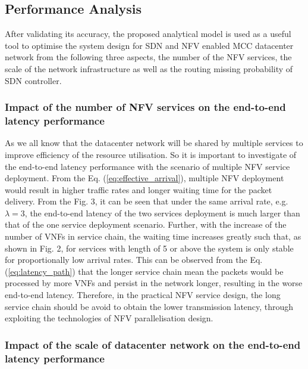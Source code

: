 \subsection{Performance Analysis}
After validating its accuracy, the proposed analytical model is used as a useful tool to optimise the system design for SDN and NFV enabled MCC datacenter network from the following three aspects, the number of the NFV services, the scale of the network infrastructure as well as the routing missing probability of SDN controller.

\subsubsection{Impact of the number of NFV services on the end-to-end latency performance}

As we all know that the datacenter network will be shared by multiple services to improve efficiency of the resource utilisation. So it is important to investigate of the end-to-end latency performance with the scenario of multiple NFV service deployment. From the Eq. (\ref{eq:effective_arrival}), multiple NFV deployment would result in higher traffic rates and longer waiting time for the packet delivery. From the Fig. 3, it can be seen that under the same arrival rate, e.g. $\lambda=3$, the end-to-end latency of the two services deployment is much larger than that of the one service deployment scenario. Further, with the increase of the number of VNFs in service chain, the waiting time increases greatly such that, as shown in Fig. 2, for services with length of 5 or above the system is only stable for proportionally low arrival rates. This can be observed from the Eq. (\ref{eq:latency_path}) that the longer service chain mean the packets would be processed by more VNFs and persist in the network longer, resulting in the worse end-to-end latency. Therefore, in the practical NFV service design, the long service chain should be avoid to obtain the lower transmission latency, through exploiting the technologies of NFV parallelisation design.

\subsubsection{Impact of the scale of datacenter network on the end-to-end latency performance}

